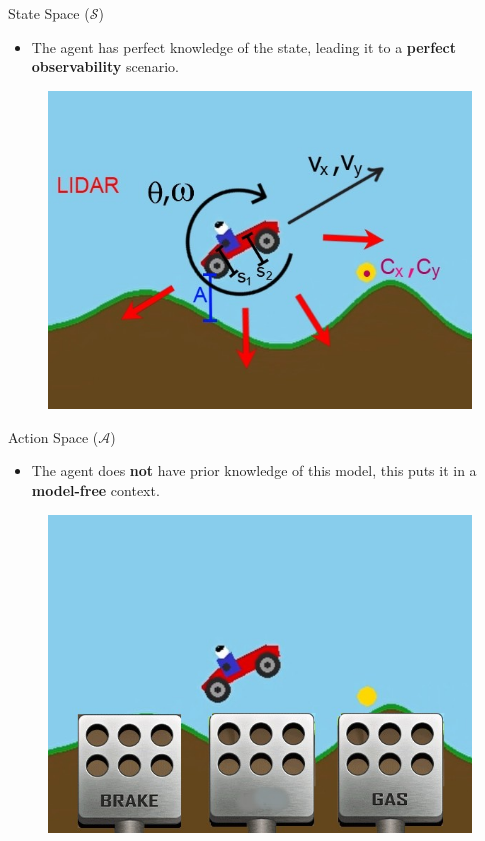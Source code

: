 \documentclass[serif]{beamer}  %
\begin{document}
    \begin{frame}{State Space ($\mathcal{S}$)}
        \begin{itemize}
            \item The agent has perfect knowledge of the state, leading it to a \textbf{perfect observability} scenario.
        \end{itemize}
    
        \begin{figure}
            \centering
            \includegraphics[width=0.8\linewidth]{presentation/images/states.jpg}
        \end{figure}
    \end{frame}

    \begin{frame}{Action Space ($\mathcal{A}$)}
        \begin{itemize}
            \item The agent does \textbf{not} have prior knowledge of this model, this puts it in a \textbf{model-free} context.
        \end{itemize}
        \begin{figure}
            \centering
            \includegraphics[width=0.8\linewidth]{images/action_space.jpg}
        \end{figure}
    \end{frame}
\end{document}
